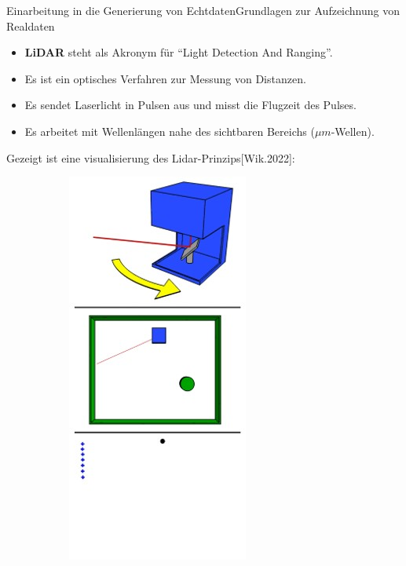 \documentclass[169, handout	]{THIbeamer} %
\begin{document}
	\begin{frame}{Einarbeitung in die Generierung von Echtdaten}{Grundlagen zur Aufzeichnung von Realdaten}
		\begin{itemize}
			\item \textbf{LiDAR} steht als Akronym für \enquote{Light Detection And Ranging}.
			\item Es ist ein optisches Verfahren zur Messung von Distanzen.
			\item Es sendet Laserlicht in Pulsen aus und misst die Flugzeit des Pulses.
			\item Es arbeitet mit Wellenlängen nahe des sichtbaren Bereichs ($\mu m$-Wellen).
		\end{itemize}
		Gezeigt ist eine visualisierung des Lidar-Prinzips[Wik.2022]:
		\begin{figure}[htbp]
    		\centering
    		\begin{subfigure}[b]{0.15\textwidth}
        		\includegraphics[scale=0.21]{required/LiDAR-Sensor1.jpg}
        		\label{Lidar-t1}
   		 	\end{subfigure}
    		\begin{subfigure}[b]{0.15\textwidth}

\end{subfigure}
\end{figure}
\end{frame}
\end{document}
